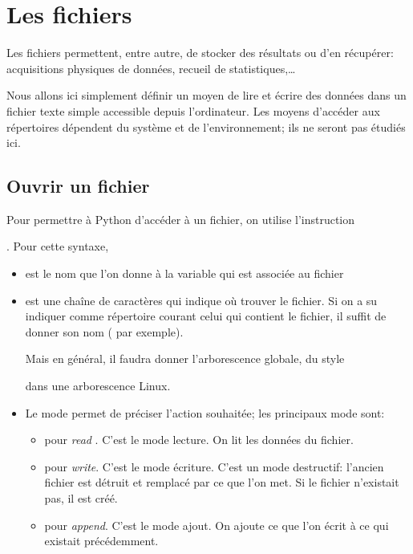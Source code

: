 \section{ Les fichiers }
Les fichiers permettent, entre autre, de stocker des résultats ou d'en récupérer: acquisitions physiques de données, recueil de statistiques,\dots 

Nous allons ici simplement définir un moyen de lire et écrire des données dans un fichier texte simple accessible depuis l'ordinateur. Les moyens d'accéder aux répertoires dépendent du système et de l'environnement; ils ne seront pas étudiés ici.
\subsection{Ouvrir un fichier}
Pour permettre à Python d'accéder à un fichier, on utilise l'instruction  

. Pour cette syntaxe,

\begin{itemize}
  \item {} est le nom que l'on donne à la variable qui est associée au fichier
  \item {} est une chaîne de caractères qui indique où trouver le fichier. Si on a su indiquer comme répertoire courant celui qui contient le fichier, il suffit de donner son nom ( par exemple). 
  
  Mais en général, il faudra donner l'arborescence globale, du style 
  
   dans une arborescence Linux.
  \item  Le mode permet de préciser l'action souhaitée; les principaux mode sont:
  
  \begin{itemize}
    \item {} pour {\it read} . C'est le mode lecture. On lit les données du fichier.
    \item {} pour {\it write}. C'est le mode écriture. C'est un mode destructif: l'ancien fichier est détruit et remplacé par ce que l'on met. Si le fichier n'existait pas, il est créé.
    \item {} pour {\it append}. C'est le mode ajout. On ajoute ce que l'on écrit à ce qui existait précédemment.
  \end{itemize}
\end{itemize}

